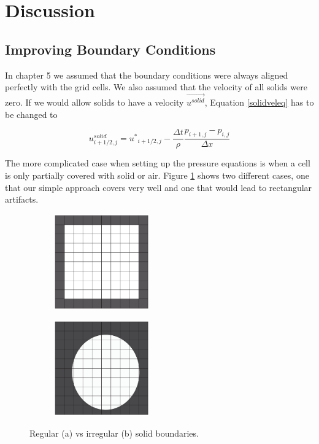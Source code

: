 \section{Discussion}
\subsection{Improving Boundary Conditions}
In chapter 5 we assumed that the boundary conditions were always aligned perfectly with the grid cells. We also assumed that the velocity of all solids were zero. If we would allow solids to have a velocity $\vec{u^{solid}}$, Equation \ref{solidveleq} has to be changed to

\begin{equation}
u^{solid}_{i+1/2,j}  = {u^*}_{i+1/2,j} - \frac{\Delta t }{\rho}\frac{p_{i+1,j} - p_{i,j}}{\Delta x}
\end{equation}

The more complicated case when setting up the pressure equations is when a cell is only partially covered with solid or air. Figure \ref{boundarycases} shows two different cases, one that our simple approach covers very well and one that would lead to rectangular artifacts.

\begin{figure}[ht!]
\centering
\begin{subfigure}[]{0.3\textwidth}
\includegraphics[height=41mm]{img/boundary1.pdf}
\end{subfigure}
\begin{subfigure}[]{0.3\textwidth}
\includegraphics[height=41mm]{img/boundary2.pdf}
\end{subfigure}
\caption{Regular (a) vs irregular (b) solid boundaries.}
\label{boundarycases}
\end{figure}

